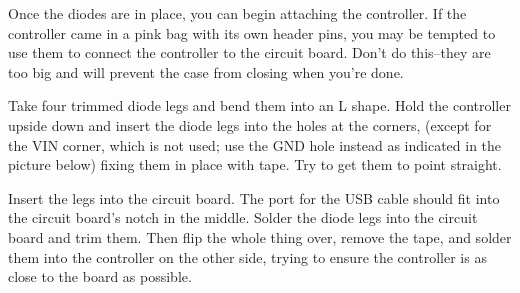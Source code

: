 \documentclass{article}
\begin{document}
Once the diodes are in place, you can begin attaching the controller.
If the controller came in a pink bag with its own header pins, you may
be tempted to use them to connect the controller to the circuit
board. Don't do this--they are too big and will prevent the case from
closing when you're done.

\vspace{1em}

Take four trimmed diode legs and bend them into an L shape. Hold the
controller upside down and insert the diode legs into the holes at the
corners, (except for the VIN corner, which is not used; use the GND
hole instead as indicated in the picture below) fixing them in place
with tape. Try to get them to point straight.

\vspace{1em}
\noindent{}
\vspace{1em}

Insert the legs into the circuit board. The port for the USB cable
should fit into the circuit board's notch in the middle. Solder the
diode legs into the circuit board and trim them. Then flip the whole
thing over, remove the tape, and solder them into the controller on
the other side, trying to ensure the controller is as close to the
board as possible.

\vspace{1em}
\noindent{}
\vspace{1em}
\end{document}
